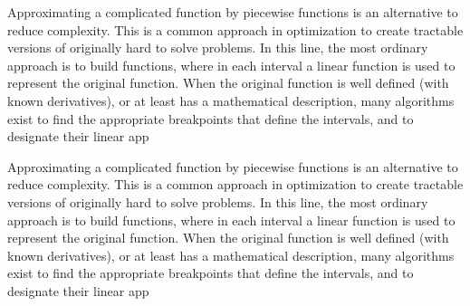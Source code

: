 Approximating a complicated function by piecewise functions is an alternative to reduce complexity. 
This is a common approach in optimization to create tractable versions of originally hard to solve problems.
%
In this line, the most ordinary approach is to build  functions, where in each interval a linear function is used to represent the original function. 
%
When the original function is well defined (with known derivatives), or at least has a mathematical description, many algorithms exist to find the appropriate breakpoints that define the intervals, and to designate their linear app

Approximating a complicated function by piecewise functions is an alternative to reduce complexity. 
This is a common approach in optimization to create tractable versions of originally hard to solve problems.
%
In this line, the most ordinary approach is to build  functions, where in each interval a linear function is used to represent the original function. 
%
When the original function is well defined (with known derivatives), or at least has a mathematical description, many algorithms exist to find the appropriate breakpoints that define the intervals, and to designate their linear app